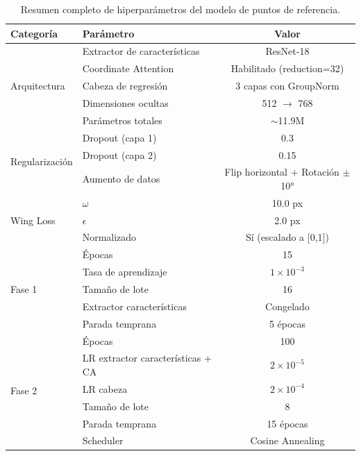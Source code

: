 \begin{table}[htbp]
    \centering
    \caption{Resumen completo de hiperparámetros del modelo de puntos de referencia.}
    \label{tab:hiperparametros_completos}
    \small
    \begin{tabular}{@{}llc@{}}
        \toprule
        \textbf{Categoría} & \textbf{Parámetro} & \textbf{Valor} \\
        \midrule
        \multirow{5}{*}{Arquitectura}
            & Extractor de características & ResNet-18 \\
            & Coordinate Attention & Habilitado (reduction=32) \\
            & Cabeza de regresión & 3 capas con GroupNorm \\
            & Dimensiones ocultas & 512 $\rightarrow$ 768 \\
            & Parámetros totales & $\sim$11.9M \\
        \midrule
        \multirow{3}{*}{Regularización}
            & Dropout (capa 1) & 0.3 \\
            & Dropout (capa 2) & 0.15 \\
            & Aumento de datos & Flip horizontal + Rotación $\pm$10° \\
        \midrule
        \multirow{3}{*}{Wing Loss}
            & $\omega$ & 10.0 px \\
            & $\epsilon$ & 2.0 px \\
            & Normalizado & Sí (escalado a [0,1]) \\
        \midrule
        \multirow{5}{*}{Fase 1}
            & Épocas & 15 \\
            & Tasa de aprendizaje & $1 \times 10^{-3}$ \\
            & Tamaño de lote & 16 \\
            & Extractor características & Congelado \\
            & Parada temprana & 5 épocas \\
        \midrule
        \multirow{6}{*}{Fase 2}
            & Épocas & 100 \\
            & LR extractor características + CA & $2 \times 10^{-5}$ \\
            & LR cabeza & $2 \times 10^{-4}$ \\
            & Tamaño de lote & 8 \\
            & Parada temprana & 15 épocas \\
            & Scheduler & Cosine Annealing \\
        \bottomrule
    \end{tabular}
\end{table}

